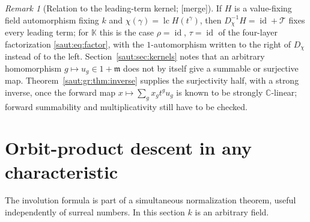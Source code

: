 \documentclass[11pt]{article}
\theoremstyle{definition}
\theoremstyle{remark}
\newtheorem{remark}[theorem]{Remark}
\newcommand{\C}{\mathbb C}
\newcommand{\K}{\mathbb K}
\newcommand{\mm}{\mathfrak m}
\newcommand{\id}{\operatorname{id}}
\newcommand{\lc}{\operatorname{lc}}
\newcommand{\mergetag}{\textup{[merge]}}
\numberwithin{equation}{section}
\begin{document}
\begin{remark}[Relation to the leading-term kernel; \mergetag]\label{saut:gr:rem:kernel}
If $H$ is a value-fixing field automorphism fixing $k$ and
$\chi(\gamma)=\lc H(t^\gamma)$, then $D_\chi^{-1}H=\id+\mathcal T$ fixes every
leading term; for $\K$ this is the case $\rho=\id$, $\tau=\id$ of the four-layer
factorization \eqref{saut:eq:factor}, with the $1$-automorphism written to the right
of $D_\chi$ instead of to the left. Section~\ref{saut:sec:kernels} notes that
an arbitrary homomorphism $g\mapsto u_g\in1+\mm$ does not by itself give a summable
or surjective map. Theorem~\ref{saut:gr:thm:inverse} supplies the surjectivity half,
with a strong inverse, once the forward map $x\mapsto\sum_gx_gt^gu_g$ is known to be
strongly $\C$-linear; forward summability and multiplicativity still have to be
checked.
\end{remark}

\section{Orbit-product descent in any characteristic}\label{saut:gr:sec:orbit}

The involution formula is part of a simultaneous normalization theorem, useful
independently of surreal numbers. In this section $k$ is an arbitrary field.
\end{document}
